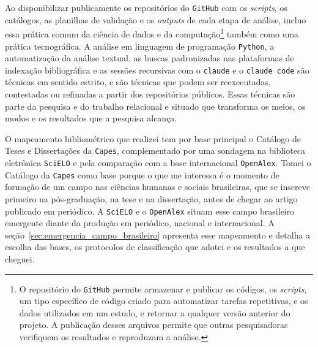 Ao disponibilizar publicamente os repositórios do \texttt{GitHub} com os \emph{scripts}, os catálogos, as planilhas de validação e os \emph{outputs} de cada etapa de análise, incluo essa prática comum da ciência de dados e da computação\footnote{O repositório do \texttt{GitHub} permite armazenar e publicar os códigos, os \textit{scripts}, um tipo específico de código criado para automatizar tarefas repetitivas, e os dados utilizados em um estudo, e retornar a qualquer versão anterior do projeto. A publicação desses arquivos permite que outras pesquisadoras verifiquem os resultados e reproduzam a análise.} também como uma prática tecnográfica. A análise em linguagem de programação \texttt{Python}, a automatização da análise textual, as buscas padronizadas nas plataformas de indexação bibliográfica e as sessões recursivas com o \texttt{claude} e o \texttt{claude code} são técnicas em sentido estrito, e são técnicas que podem ser reexecutadas, contestadas ou refinadas a partir dos repositórios públicos. Essas técnicas são parte da pesquisa e do trabalho relacional e situado que transforma os meios, os modos e os resultados que a pesquisa alcança.

O mapeamento bibliométrico que realizei tem por base principal o Catálogo de Teses e Dissertações da \texttt{Capes}, complementado por uma sondagem na biblioteca eletrônica \texttt{SciELO} e pela comparação com a base internacional \texttt{OpenAlex}. Tomei o Catálogo da \texttt{Capes} como base porque o que me interessa é o momento de formação de um campo nas ciências humanas e sociais brasileiras, que se inscreve primeiro na pós-graduação, na tese e na dissertação, antes de chegar ao artigo publicado em periódico. A \texttt{SciELO} e o \texttt{OpenAlex} situam esse campo brasileiro emergente diante da produção em periódico, nacional e internacional. A seção~\ref{sec:emergencia_campo_brasileiro} apresenta esse mapeamento e detalha a escolha das bases, os protocolos de classificação que adotei e os resultados a que cheguei. 

